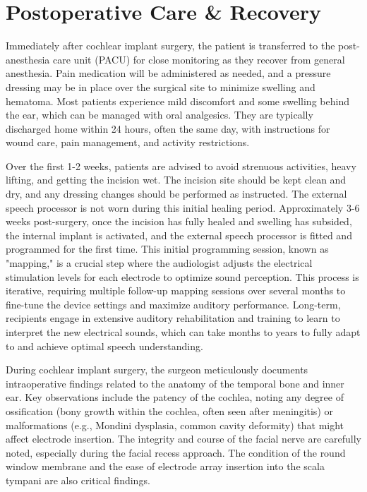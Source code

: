 \section*{Postoperative Care \& Recovery}
Immediately after cochlear implant surgery, the patient is transferred to the post-anesthesia care unit (PACU) for close monitoring as they recover from general anesthesia. Pain medication will be administered as needed, and a pressure dressing may be in place over the surgical site to minimize swelling and hematoma. Most patients experience mild discomfort and some swelling behind the ear, which can be managed with oral analgesics. They are typically discharged home within 24 hours, often the same day, with instructions for wound care, pain management, and activity restrictions.

Over the first 1-2 weeks, patients are advised to avoid strenuous activities, heavy lifting, and getting the incision wet. The incision site should be kept clean and dry, and any dressing changes should be performed as instructed. The external speech processor is not worn during this initial healing period. Approximately 3-6 weeks post-surgery, once the incision has fully healed and swelling has subsided, the internal implant is activated, and the external speech processor is fitted and programmed for the first time. This initial programming session, known as "mapping," is a crucial step where the audiologist adjusts the electrical stimulation levels for each electrode to optimize sound perception. This process is iterative, requiring multiple follow-up mapping sessions over several months to fine-tune the device settings and maximize auditory performance. Long-term, recipients engage in extensive auditory rehabilitation and training to learn to interpret the new electrical sounds, which can take months to years to fully adapt to and achieve optimal speech understanding.

During cochlear implant surgery, the surgeon meticulously documents intraoperative findings related to the anatomy of the temporal bone and inner ear. Key observations include the patency of the cochlea, noting any degree of ossification (bony growth within the cochlea, often seen after meningitis) or malformations (e.g., Mondini dysplasia, common cavity deformity) that might affect electrode insertion. The integrity and course of the facial nerve are carefully noted, especially during the facial recess approach. The condition of the round window membrane and the ease of electrode array insertion into the scala tympani are also critical findings.


